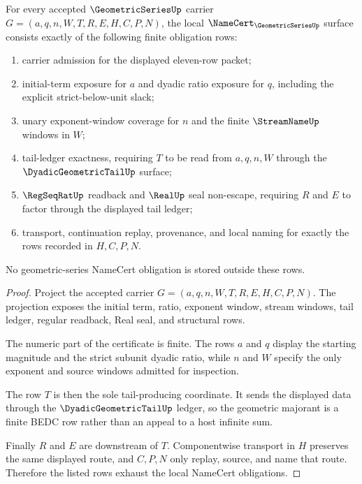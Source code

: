 \begin{theorem}
\label{thm:geometric-series-namecert-obligations}
For every accepted $\GeometricSeriesUp$ carrier $G=(a,q,n,W,T,R,E,H,C,P,N)$, the local $\NameCert_{\GeometricSeriesUp}$ surface consists exactly of the following finite obligation rows:
\begin{enumerate}
\item carrier admission for the displayed eleven-row packet;
\item initial-term exposure for $a$ and dyadic ratio exposure for $q$, including the explicit strict-below-unit slack;
\item unary exponent-window coverage for $n$ and the finite $\StreamNameUp$ windows in $W$;
\item tail-ledger exactness, requiring $T$ to be read from $a,q,n,W$ through the $\DyadicGeometricTailUp$ surface;
\item $\RegSeqRatUp$ readback and $\RealUp$ seal non-escape, requiring $R$ and $E$ to factor through the displayed tail ledger;
\item transport, continuation replay, provenance, and local naming for exactly the rows recorded in $H,C,P,N$.
\end{enumerate}
No geometric-series NameCert obligation is stored outside these rows.
\end{theorem}
\begin{proof}
Project the accepted carrier $G=(a,q,n,W,T,R,E,H,C,P,N)$. The projection exposes the initial term, ratio, exponent window, stream windows, tail ledger, regular readback, Real seal, and structural rows.

The numeric part of the certificate is finite. The rows $a$ and $q$ display the starting magnitude and the strict subunit dyadic ratio, while $n$ and $W$ specify the only exponent and source windows admitted for inspection.

The row $T$ is then the sole tail-producing coordinate. It sends the displayed data through the $\DyadicGeometricTailUp$ ledger, so the geometric majorant is a finite BEDC row rather than an appeal to a host infinite sum.

Finally $R$ and $E$ are downstream of $T$. Componentwise transport in $H$ preserves the same displayed route, and $C,P,N$ only replay, source, and name that route. Therefore the listed rows exhaust the local NameCert obligations.
\end{proof}

